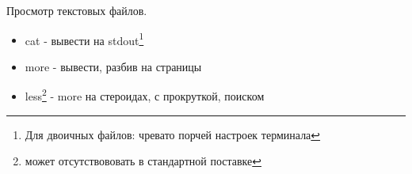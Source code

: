 \begin{frame}{Просмотр текстовых файлов.}
      \begin{itemize}
        \item \alert{cat} - вывести на stdout\footnote{Для двоичных файлов: чревато порчей настроек терминала}
        \item \alert{more} - вывести, разбив на страницы
        \item \alert{less}\footnote{может отсутствововать в стандартной поставке} - \alert{more} на стероидах, с прокруткой, поиском
      \end{itemize} 
\end{frame}
